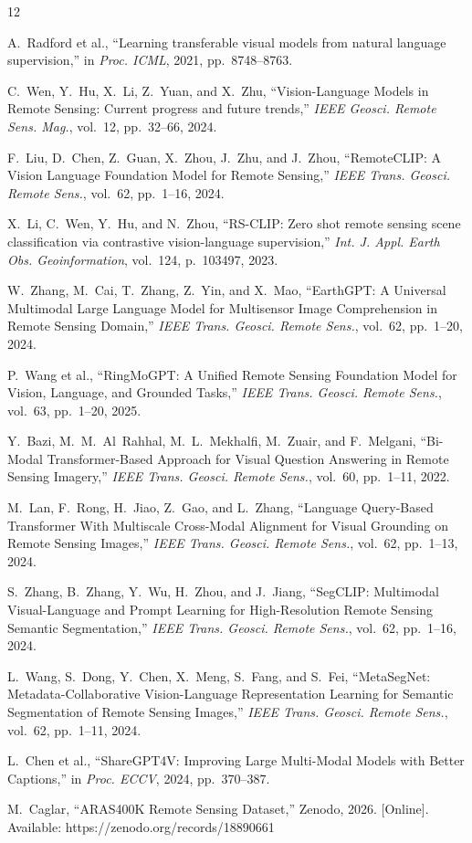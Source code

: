\documentclass[conference]{IEEEtran}
\begin{document}
\footnotesize
\begin{thebibliography}{12}

A.~Radford et al., ``Learning transferable visual models from natural language supervision,'' in \textit{Proc. ICML}, 2021, pp.~8748--8763.

C.~Wen, Y.~Hu, X.~Li, Z.~Yuan, and X.~Zhu, ``Vision-Language Models in Remote Sensing: Current progress and future trends,'' \textit{IEEE Geosci. Remote Sens. Mag.}, vol.~12, pp.~32--66, 2024.

F.~Liu, D.~Chen, Z.~Guan, X.~Zhou, J.~Zhu, and J.~Zhou, ``RemoteCLIP: A Vision Language Foundation Model for Remote Sensing,'' \textit{IEEE Trans. Geosci. Remote Sens.}, vol.~62, pp.~1--16, 2024.

X.~Li, C.~Wen, Y.~Hu, and N.~Zhou, ``RS-CLIP: Zero shot remote sensing scene classification via contrastive vision-language supervision,'' \textit{Int. J. Appl. Earth Obs. Geoinformation}, vol.~124, p.~103497, 2023.

W.~Zhang, M.~Cai, T.~Zhang, Z.~Yin, and X.~Mao, ``EarthGPT: A Universal Multimodal Large Language Model for Multisensor Image Comprehension in Remote Sensing Domain,'' \textit{IEEE Trans. Geosci. Remote Sens.}, vol.~62, pp.~1--20, 2024.

P.~Wang et al., ``RingMoGPT: A Unified Remote Sensing Foundation Model for Vision, Language, and Grounded Tasks,'' \textit{IEEE Trans. Geosci. Remote Sens.}, vol.~63, pp.~1--20, 2025.

Y.~Bazi, M.~M.~Al~Rahhal, M.~L.~Mekhalfi, M.~Zuair, and F.~Melgani, ``Bi-Modal Transformer-Based Approach for Visual Question Answering in Remote Sensing Imagery,'' \textit{IEEE Trans. Geosci. Remote Sens.}, vol.~60, pp.~1--11, 2022.

M.~Lan, F.~Rong, H.~Jiao, Z.~Gao, and L.~Zhang, ``Language Query-Based Transformer With Multiscale Cross-Modal Alignment for Visual Grounding on Remote Sensing Images,'' \textit{IEEE Trans. Geosci. Remote Sens.}, vol.~62, pp.~1--13, 2024.

S.~Zhang, B.~Zhang, Y.~Wu, H.~Zhou, and J.~Jiang, ``SegCLIP: Multimodal Visual-Language and Prompt Learning for High-Resolution Remote Sensing Semantic Segmentation,'' \textit{IEEE Trans. Geosci. Remote Sens.}, vol.~62, pp.~1--16, 2024.

L.~Wang, S.~Dong, Y.~Chen, X.~Meng, S.~Fang, and S.~Fei, ``MetaSegNet: Metadata-Collaborative Vision-Language Representation Learning for Semantic Segmentation of Remote Sensing Images,'' \textit{IEEE Trans. Geosci. Remote Sens.}, vol.~62, pp.~1--11, 2024.

L.~Chen et al., ``ShareGPT4V: Improving Large Multi-Modal Models with Better Captions,'' in \textit{Proc. ECCV}, 2024, pp.~370--387.

M.~Caglar, ``ARAS400K Remote Sensing Dataset,'' Zenodo, 2026. [Online]. Available: https://zenodo.org/records/18890661

\end{thebibliography}
\end{document}
